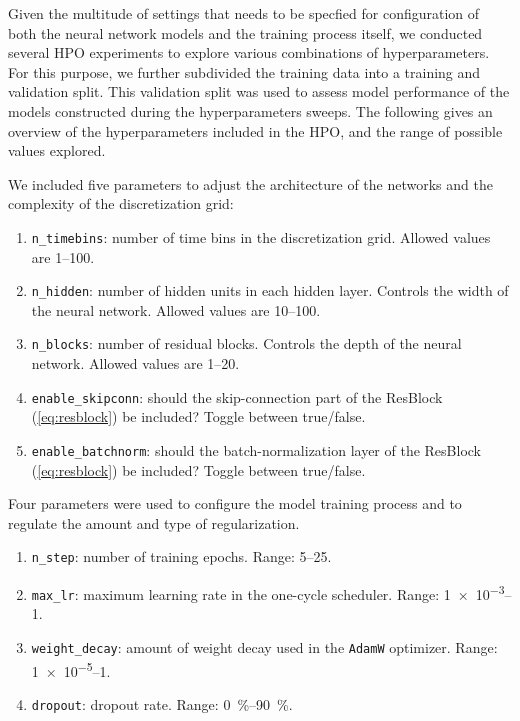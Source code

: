 Given the multitude of settings that needs to be specfied
for configuration of both the neural network models and
the training process itself, 
we conducted several \ac{HPO} experiments to
explore various combinations of hyperparameters.
For this purpose, we further subdivided the training data
into a training and validation split.
This validation split was used to assess model performance
of the models constructed during the hyperparameters sweeps.
The following gives an overview of the hyperparameters
included in the \ac{HPO}, and the range of possible values explored.

\begin{fullwidth}
\begin{multicols}{3}
\raggedcolumns

We included five parameters to adjust the architecture of the networks
and the complexity of the discretization grid:
\begin{enumerate}[label=\alph*)]
    \item \verb|n_timebins|:
        number of time bins in the discretization grid.
        Allowed values are 
        \numrange{1}{100}.
    \item \verb|n_hidden|:
        number of hidden units in each hidden layer.
        Controls the width of the neural network.
        Allowed values are 
        \numrange{10}{100}.
    \item \verb|n_blocks|:
        number of residual blocks.
        Controls the depth of the neural network.
        Allowed values are 
        \numrange{1}{20}.
    \item \verb|enable_skipconn|:
        should the skip-connection part of the ResBlock
        (\cref{eq:resblock}) be included? 
        Toggle between true/false.
    \item \verb|enable_batchnorm|:
        should the batch-normalization layer of the ResBlock
        (\cref{eq:resblock}) be included? 
        Toggle between true/false.
\end{enumerate}

Four parameters were used to configure the model training process
and to regulate the amount and type of regularization.
\begin{enumerate}[label=\alph*), resume]
    \item \verb|n_step|:
        number of training epochs.
        Range: \numrange{5}{25}.
    \item \verb|max_lr|:
        maximum learning rate in the one-cycle scheduler.
        Range: \numrange{1e-3}{1}.
    \item \verb|weight_decay|:
        amount of  weight decay used in the \verb|AdamW| optimizer.
        Range: \numrange{1e-5}{1}.
    \item \verb|dropout|:  
        dropout rate. 
        Range: \qtyrange{0}{90}{\percent}.
\end{enumerate}


\end{multicols}
\end{fullwidth}
